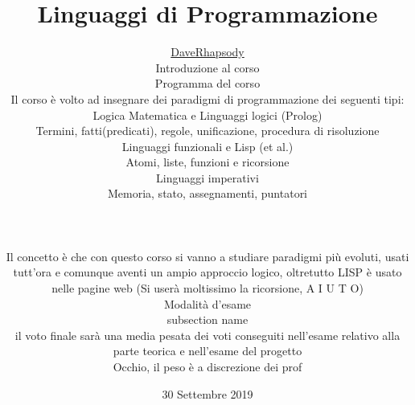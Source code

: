 \documentclass[12pt, a4paper, openany, oneside]{book}
\begin{document}
\selectfont
\author{\href{https://github.com/daverhapsody}{DaveRhapsody}
\title{Linguaggi di Programmazione}
\color{blue}
\date{30 Settembre 2019}
\color{black}
\maketitle
\tableofcontents
\chapter{Introduzione al corso}
\section{Programma del corso}
Il corso è volto ad insegnare dei paradigmi di programmazione dei seguenti tipi:
\subsection{Logica Matematica e Linguaggi logici (Prolog)}
Termini, fatti(predicati), regole, unificazione, procedura di risoluzione
\subsection{Linguaggi funzionali e Lisp (et al.)}
Atomi, liste, funzioni e ricorsione
\subsection{Linguaggi imperativi} %
\label{sub:linguaggi_imperativi}
Memoria, stato, assegnamenti, puntatori
\\ 
{\color{black} \rule{\linewidth}{0.3mm} }
\\
Il concetto è che con questo corso si vanno a studiare paradigmi più evoluti,
usati tutt'ora e comunque aventi un ampio approccio logico, oltretutto LISP è 
usato nelle pagine web (Si userà moltissimo la ricorsione, A I U T O)
\section{Modalità d'esame}
\label{sec:modalità_d_esame}
\subsection{subsection name}
\label{sub:subsection_name}
\begin{itemize}
	\item il voto finale sarà una media pesata dei voti conseguiti nell'esame 
	relativo alla parte teorica e nell'esame del progetto 
	\begin{itemize}
		\item Occhio, il peso è a discrezione dei prof
	\end{itemize}
\end{itemize}
}
\end{document}
